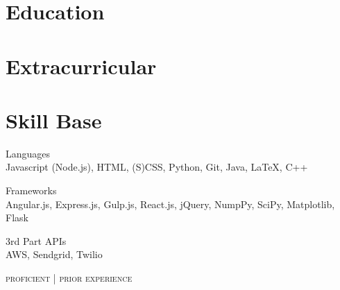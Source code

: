 \documentclass[9pt]{article}
\begin{document}
\begin{minipage}[t]{0.35\textwidth}
  \vspace{0pt}

  \section{Education}

    

    

  \section{Extracurricular}

    

    

    

    

  \section{Skill Base}
  {\raggedright
    Languages \\
    {\small
      {\color{highlight}
        Javascript (Node.js), HTML, (S)CSS, Python, Git,
      }
      Java, LaTeX, C++
    }
    \vspace{5pt}

    Frameworks \\
    {\small
      {\color{highlight}
        Angular.js, Express.js, Gulp.js, React.js,
      }
      jQuery, NumpPy, SciPy, Matplotlib, Flask \\
    }

    \vspace{5pt}

    3rd Part APIs \\
    {\small
      {\color{highlight}
        AWS,
      }
      Sendgrid, Twilio
    }

    \hfill\textsc{\footnotesize{{\color{highlight} proficient} | prior experience}}
  }
\end{minipage}
\end{document}
